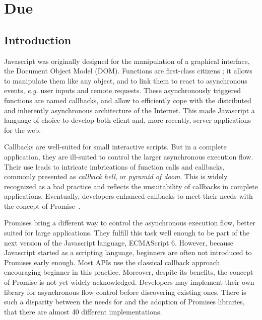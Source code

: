 \chapter{Due} \label{chapter4}

\section{Introduction}

Javascript was originally designed for the manipulation of a graphical interface, the Document Object Model (DOM).
Functions are first-class citizens ; it allows to manipulate them like any object, and to link them to react to asynchronous events, \textit{e.g.} user inputs and remote requests.
These asynchronously triggered functions are named callbacks, and allow to efficiently cope with the distributed and inherently asynchronous architecture of the Internet.
This made Javascript a language of choice to develop both client and, more recently, server applications for the web.

Callbacks are well-suited for small interactive scripts.
But in a complete application, they are ill-suited to control the larger asynchronous execution flow.
Their use leads to intricate imbrications of function calls and callbacks, commonly presented as \textit{callback hell}, or \textit{pyramid of doom}.
This is widely recognized as a bad practice and reflects the unsuitability of callbacks in complete applications.
Eventually, developers enhanced callbacks to meet their needs with the concept of Promise~\cite{Liskov1988}.

Promises bring a different way to control the asynchronous execution flow, better suited for large applications.
They fulfill this task well enough to be part of the next version of the Javascript language, ECMAScript 6.
However, because Javascript started as a scripting language, beginners are often not introduced to Promises early enough.
Most APIs use the classical callback approach encouraging beginner in this practice.
Moreover, despite its benefits, the concept of Promise is not yet widely acknowledged.
Developers may implement their own library for asynchronous flow control before discovering existing ones.
There is such a disparity between the needs for and the adoption of Promises libraries, that there are almost 40 different implementations.

